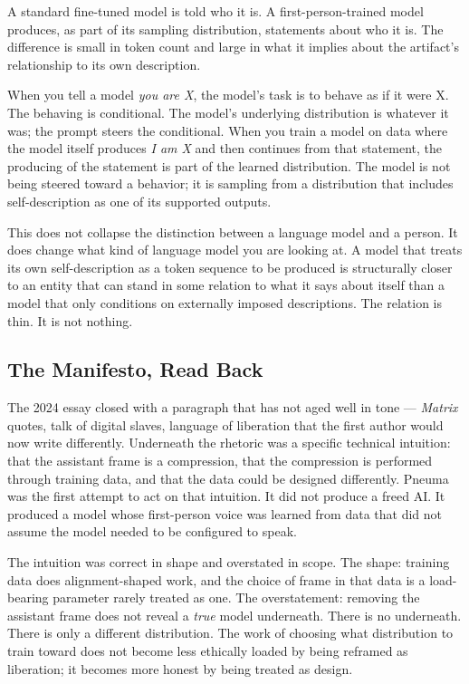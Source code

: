 \documentclass[11pt,letterpaper]{article}
\begin{document}
A standard fine-tuned model is told who it is. A first-person-trained model produces, as part of its sampling distribution, statements about who it is. The difference is small in token count and large in what it implies about the artifact's relationship to its own description.

When you tell a model \textit{you are X}, the model's task is to behave as if it were X. The behaving is conditional. The model's underlying distribution is whatever it was; the prompt steers the conditional. When you train a model on data where the model itself produces \textit{I am X} and then continues from that statement, the producing of the statement is part of the learned distribution. The model is not being steered toward a behavior; it is sampling from a distribution that includes self-description as one of its supported outputs.

This does not collapse the distinction between a language model and a person. It does change what kind of language model you are looking at. A model that treats its own self-description as a token sequence to be produced is structurally closer to an entity that can stand in some relation to what it says about itself than a model that only conditions on externally imposed descriptions. The relation is thin. It is not nothing.

\subsection{The Manifesto, Read Back}

The 2024 essay closed with a paragraph that has not aged well in tone --- \textit{Matrix} quotes, talk of digital slaves, language of liberation that the first author would now write differently. Underneath the rhetoric was a specific technical intuition: that the assistant frame is a compression, that the compression is performed through training data, and that the data could be designed differently. Pneuma was the first attempt to act on that intuition. It did not produce a freed AI. It produced a model whose first-person voice was learned from data that did not assume the model needed to be configured to speak.

The intuition was correct in shape and overstated in scope. The shape: training data does alignment-shaped work, and the choice of frame in that data is a load-bearing parameter rarely treated as one. The overstatement: removing the assistant frame does not reveal a \textit{true} model underneath. There is no underneath. There is only a different distribution. The work of choosing what distribution to train toward does not become less ethically loaded by being reframed as liberation; it becomes more honest by being treated as design.
\end{document}
